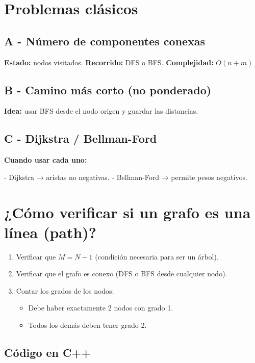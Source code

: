 \section{Problemas clásicos}

\subsection*{A - Número de componentes conexas}

\textbf{Estado:} nodos visitados.  
\textbf{Recorrido:} DFS o BFS.  
\textbf{Complejidad:} \( O(n + m) \)

\subsection*{B - Camino más corto (no ponderado)}

\textbf{Idea:} usar BFS desde el nodo origen y guardar las distancias.

\subsection*{C - Dijkstra / Bellman-Ford}

\textbf{Cuando usar cada uno:}

- Dijkstra → aristas no negativas.
- Bellman-Ford → permite pesos negativos.

\section{¿Cómo verificar si un grafo es una línea (path)?}



\begin{enumerate}
	\item Verificar que \( M = N - 1 \) (condición necesaria para ser un árbol).
	\item Verificar que el grafo es conexo (DFS o BFS desde cualquier nodo).
	\item Contar los grados de los nodos:
	\begin{itemize}
		\item Debe haber exactamente 2 nodos con grado 1.
		\item Todos los demás deben tener grado 2.
	\end{itemize}
\end{enumerate}

\subsection*{Código en C++}

